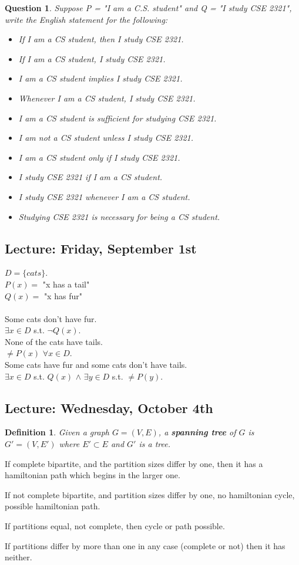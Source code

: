 \documentclass[10pt]{article}
\theoremstyle{plain}
\newtheorem{Def}[Thm]{Definition}
\newtheorem{Q}[Thm]{Question}
\theoremstyle{definition}
\begin{document}
\begin{Q}
Suppose P = "I am a C.S. student" and Q = "I study CSE 2321", write the English statement for the following: 

\begin{itemize}
\item If I am a CS student, then I study CSE 2321. 
\item If I am a CS student, I study CSE 2321. 
\item I am a CS student implies I study CSE 2321. 
\item Whenever I am a CS student, I study CSE 2321. 
\item I am a CS student is sufficient for studying CSE 2321. 
\item I am not a CS student unless I study CSE 2321. 
\item I am a CS student only if I study CSE 2321. 
\item I study CSE 2321 if I am a CS student. 
\item I study CSE 2321 whenever I am a CS student. 
\item Studying CSE 2321 is necessary for being a CS student. 
\end{itemize}
\end{Q}

\subsection*{Lecture: Friday, September 1st}

$D = \{cats\}$. \\
$P(x) = $ "x has a tail"\\
$Q(x) = $ "x has fur"\\\\
Some cats don't have fur. \\
$\exists x \in D$ s.t. $\neg Q(x)$. \\
None of the cats have tails. \\
$\neq P(x)$ $\forall x \in D$. \\
Some cats have fur and some cats don't have tails. \\
$\exists x \in D$ s.t. $Q(x)$ $\wedge$ $\exists y \in D$ s.t. $\neq P(y)$. 

\subsection*{Lecture: Wednesday, October 4th}

\begin{Def}
Given a graph $G = (V,E)$, a \textbf{spanning tree} of $G$ is $G' = (V,E')$ where $E' \subset E$ and $G'$ is a tree. 
\end{Def}

If complete bipartite, and the partition sizes differ by one, then it has a hamiltonian path which begins in the larger one. 

If not complete bipartite, and partition sizes differ by one, no hamiltonian cycle, possible hamiltonian path. 

If partitions equal, not complete, then cycle or path possible. 

If partitions differ by more than one in any case (complete or not) then it has neither. 
\end{document}
